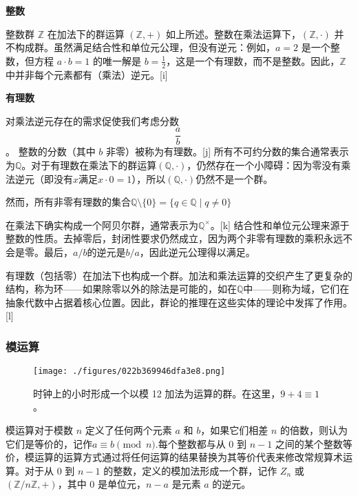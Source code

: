 \textbf{整数}  

整数群 \( \mathbb{Z} \) 在加法下的群运算 \( (\mathbb{Z}, +) \) 如上所述。整数在乘法运算下，\( (\mathbb{Z}, \cdot) \) 并不构成群。虽然满足结合性和单位元公理，但没有逆元：例如，\( a = 2 \) 是一个整数，但方程 \( a \cdot b = 1 \) 的唯一解是 \( b = \frac{1}{2} \)，这是一个有理数，而不是整数。因此，\( \mathbb{Z} \) 中并非每个元素都有（乘法）逆元。[i]

\textbf{有理数}  

对乘法逆元存在的需求促使我们考虑分数
\[\frac{a}{b}~\]。  
整数的分数（其中 \( b \) 非零）被称为有理数。[j] 所有不可约分数的集合通常表示为\( \mathbb{Q}\)。对于有理数在乘法下的群运算\( (\mathbb{Q}, \cdot)\)，仍然存在一个小障碍：因为零没有乘法逆元（即没有\( x \)满足\( x \cdot 0 = 1 \)），所以\( (\mathbb{Q}, \cdot)\)仍然不是一个群。

然而，所有非零有理数的集合\(\mathbb{Q} \setminus \{0\} = \{q \in \mathbb{Q} \mid q \neq 0\}\)

在乘法下确实构成一个阿贝尔群，通常表示为\( \mathbb{Q}^\times \)。[k] 结合性和单位元公理来源于整数的性质。去掉零后，封闭性要求仍然成立，因为两个非零有理数的乘积永远不会是零。最后，\( a/b \)的逆元是\(b/a\)，因此逆元公理得以满足。

有理数（包括零）在加法下也构成一个群。加法和乘法运算的交织产生了更复杂的结构，称为环——如果除零以外的除法是可能的，如在\(\mathbb{Q}\)中——则称为域，它们在抽象代数中占据着核心位置。因此，群论的推理在这些实体的理论中发挥了作用。[l]
\subsubsection{模运算}
\begin{figure}[ht]
\centering
\texttt{[image: ./figures/022b369946dfa3e8.png]}
\caption{时钟上的小时形成一个以模 12 加法为运算的群。在这里，\( 9 + 4 \equiv 1 \)。} \label{fig_GroupM_5}
\end{figure}
模运算对于模数 \( n \) 定义了任何两个元素 \( a \) 和 \( b \)，如果它们相差 \( n \) 的倍数，则认为它们是等价的，记作\(a \equiv b \pmod{n}\).每个整数都与从 0 到 \( n - 1 \) 之间的某个整数等价，模运算的运算方式通过将任何运算的结果替换为其等价代表来修改常规算术运算。对于从 0 到 \( n - 1 \) 的整数，定义的模加法形成一个群，记作 \( Z_n \) 或 \( (\mathbb{Z}/n\mathbb{Z}, +) \)，其中 0 是单位元，\( n - a \) 是元素 \( a \) 的逆元。

